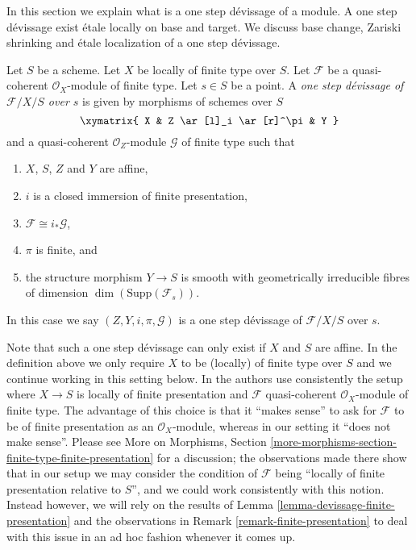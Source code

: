 \noindent
In this section we explain what is a one step d\'evissage of a
module. A one step d\'evissage exist \'etale locally on base and target.
We discuss base change, Zariski shrinking and \'etale localization of
a one step d\'evissage.

\begin{definition}
\label{definition-one-step-devissage}
Let $S$ be a scheme.
Let $X$ be locally of finite type over $S$.
Let $\mathcal{F}$ be a quasi-coherent $\mathcal{O}_X$-module of finite type.
Let $s \in S$ be a point.
A {\it one step d\'evissage of $\mathcal{F}/X/S$ over $s$}
is given by morphisms of schemes over $S$
$$
\xymatrix{
X & Z \ar[l]_i \ar[r]^\pi & Y
}
$$
and a quasi-coherent $\mathcal{O}_Z$-module $\mathcal{G}$ of finite type
such that
\begin{enumerate}
\item $X$, $S$, $Z$ and $Y$ are affine,
\item $i$ is a closed immersion of finite presentation,
\item $\mathcal{F} \cong i_*\mathcal{G}$,
\item $\pi$ is finite, and
\item the structure morphism $Y \to S$ is smooth with
geometrically irreducible fibres of
dimension $\dim(\text{Supp}(\mathcal{F}_s))$.
\end{enumerate}
In this case we say $(Z, Y, i, \pi, \mathcal{G})$ is a one step
d\'evissage of $\mathcal{F}/X/S$ over $s$.
\end{definition}

\noindent
Note that such a one step d\'evissage can only exist if $X$ and $S$
are affine. In the definition above we only require $X$ to be
(locally) of finite type over $S$ and we continue working in this
setting below. In \cite{GruRay} the authors use consistently the setup
where $X \to S$ is locally of finite presentation and $\mathcal{F}$
quasi-coherent $\mathcal{O}_X$-module of finite type. The advantage
of this choice is that it ``makes sense'' to ask for $\mathcal{F}$ to
be of finite presentation as an $\mathcal{O}_X$-module, whereas in our
setting it ``does not make sense''. Please see
More on Morphisms, Section
\ref{more-morphisms-section-finite-type-finite-presentation}
for a discussion; the observations made there show that in our setup
we may consider the condition of $\mathcal{F}$ being ``locally of finite
presentation relative to $S$'', and we could work consistently with this
notion. Instead however, we will rely on the results of
Lemma \ref{lemma-devissage-finite-presentation}
and the observations in
Remark \ref{remark-finite-presentation}
to deal with this issue in an ad hoc fashion whenever it comes up.

